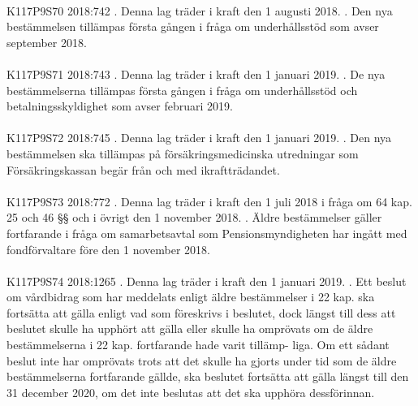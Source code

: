 \documentclass[a4paper,notitlepage,openany,10pt]{book}
\begin{document}
\paragraph*{}
{\tiny K117P9S70}
2018:742
. Denna lag träder i kraft den 1 augusti 2018.
. Den nya bestämmelsen tillämpas första gången i fråga om underhållsstöd som avser september 2018.
\paragraph*{}
{\tiny K117P9S71}
2018:743
. Denna lag träder i kraft den 1 januari 2019.
. De nya bestämmelserna tillämpas första gången i fråga om underhållsstöd och betalningsskyldighet som avser februari 2019.
\paragraph*{}
{\tiny K117P9S72}
2018:745
. Denna lag träder i kraft den 1 januari 2019.
. Den nya bestämmelsen ska tillämpas på försäkringsmedicinska utredningar som Försäkringskassan begär från och med ikraftträdandet.
\paragraph*{}
{\tiny K117P9S73}
2018:772
. Denna lag träder i kraft den 1 juli 2018 i fråga om 64 kap. 25 och 46 §§ och i övrigt den 1 november 2018.
. Äldre bestämmelser gäller fortfarande i fråga om samarbetsavtal som Pensionsmyndigheten har ingått med fondförvaltare före den 1 november 2018.
\paragraph*{}
{\tiny K117P9S74}
2018:1265
. Denna lag träder i kraft den 1 januari 2019.
. Ett beslut om vårdbidrag som har meddelats enligt äldre bestämmelser i 22 kap. ska fortsätta att gälla enligt vad som föreskrivs i beslutet, dock längst till dess att beslutet skulle ha upphört att gälla eller skulle ha omprövats om de äldre bestämmelserna i 22 kap. fortfarande hade varit tillämp- liga. Om ett sådant beslut inte har omprövats trots att det skulle ha gjorts under tid som de äldre bestämmelserna fortfarande gällde, ska beslutet fortsätta att gälla längst till den 31 december 2020, om det inte beslutas att det ska upphöra dessförinnan.
\end{document}
